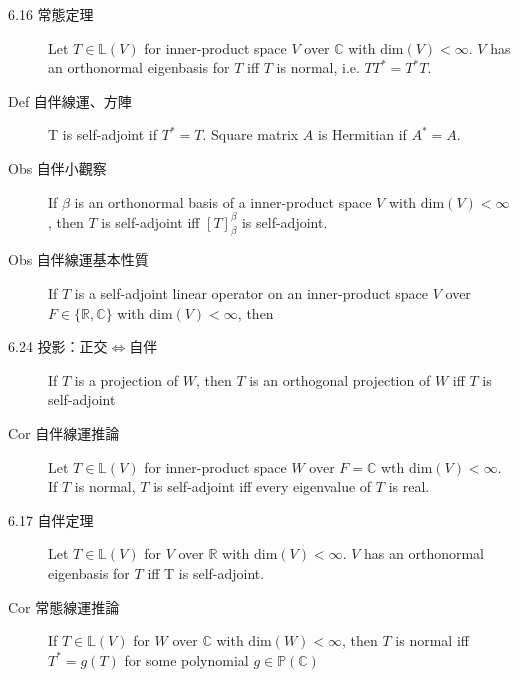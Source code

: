 \documentclass[9pt, twocolumn]{extarticle}
\newcommand{\vsdim}{\ensuremath{\text{dim}}}
\newcommand{\realnum}{\mathbb{R}}
\newcommand{\complexnum}{\mathbb{C}}
\newcommand{\ltrans}{\mathbb{L}}
\newcommand{\polynom}{\mathbb{P}}
\begin{document}
\begin{description}
    \item[6.16 常態定理] Let $T\in \ltrans(V)$ for inner-product space $V$ over $\complexnum$ with $\vsdim(V) < \infty$. $V$ has an orthonormal eigenbasis for $T$ iff $T$ is normal, i.e. $TT^*=T^*T$.
    \item[Def 自伴線運、方陣] T is self-adjoint if $T^* = T$. Square matrix $A$ is Hermitian if $A^*=A$.
    \item[Obs 自伴小觀察] If $\beta$ is an orthonormal basis of a inner-product space $V$ with $\vsdim(V) < \infty$, then $T$ is self-adjoint iff $[T]^\beta_\beta$ is self-adjoint.
    \item[Obs 自伴線運基本性質] If $T$ is a self-adjoint linear operator on an inner-product space $V$ over $F \in \{\realnum, \complexnum\}$ with $\vsdim(V)<\infty$, then
    \item[6.24 投影：正交$\Leftrightarrow$自伴] If $T$ is a projection of $W$, then $T$ is an orthogonal projection of $W$ iff $T$ is self-adjoint
    \item[Cor 自伴線運推論] Let $T \in \ltrans(V)$ for inner-product space $W$ over $F = \complexnum$ wth $\vsdim(V) < \infty$. If $T$ is normal, $T$ is self-adjoint iff every eigenvalue of $T$ is real.
    \item[6.17 自伴定理] Let $T \in \ltrans(V)$ for $V$ over $\realnum$ with $\vsdim(V)<\infty$. $V$ has an orthonormal eigenbasis for $T$ iff T is self-adjoint.
    \item[Cor 常態線運推論] If $T\in \ltrans(V)$ for $W$ over $\complexnum$ with $\vsdim(W)< \infty$, then $T$ is normal iff $T^* = g(T)$ for some polynomial $g \in \polynom(\complexnum)$



\end{description}
\end{document}
